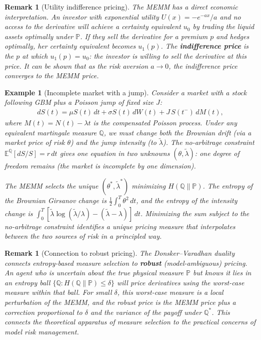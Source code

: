 \documentclass{report}
\theoremstyle{spacedplain}
\theoremstyle{spaceddefinition}
\newtheorem{example}[theorem]{Example}
\theoremstyle{spacedremark}
\newtheorem{remark}[theorem]{Remark}
\begin{document}
\begin{remark}[Utility indifference pricing]
The MEMM has a direct economic interpretation. An investor with exponential utility $U(x) = -e^{-ax}/a$ and no access to the derivative will achieve a certainty equivalent $u_0$ by trading the liquid assets optimally under $\mathbb{P}$. If they sell the derivative for a premium $p$ and hedges
optimally, her certainty equivalent becomes $u_1(p)$. The
\textbf{indifference price} is the $p$ at which $u_1(p) = u_0$: the investor is willing to sell the derivative at this price. It can be shown that as the risk aversion $a \to 0$, the indifference price converges to the MEMM price.
\end{remark}
 
\begin{example}[Incomplete market with a jump]
Consider a market with a stock following GBM plus a Poisson jump of fixed size $J$:
\begin{align}
    dS(t) = \mu S(t)\,dt + \sigma S(t)\,dW(t) + J\,S(t^-)\,dM(t),
\end{align}
where $M(t) = N(t) - \lambda t$ is the compensated Poisson process. Under any equivalent martingale measure $\mathbb{Q}$, we must change both the Brownian drift (via a market price of risk $\theta$) and the jump intensity (to
$\tilde{\lambda}$). The no-arbitrage constraint $\mathbb{E}^\mathbb{Q}[dS/S] = r\,dt$ gives one equation in two unknowns $(\theta, \tilde{\lambda})$: one degree of freedom remains (the market is incomplete by one dimension).
 
The MEMM selects the unique $(\theta^*, \tilde{\lambda}^*)$ minimizing $H(\mathbb{Q}\|\mathbb{P})$. The entropy of the Brownian Girsanov change is $\frac{1}{2}\int_0^T\theta^2\,dt$, and the entropy of the intensity change is $\int_0^T[\tilde{\lambda}\log(\tilde{\lambda}/\lambda) - (\tilde{\lambda} - \lambda)]\,dt$. Minimizing the sum subject to the no-arbitrage constraint identifies a unique pricing measure that interpolates between the two sources of risk in a principled way.
\end{example}
 
\begin{remark}[Connection to robust pricing]
The Donsker--Varadhan duality connects entropy-based measure selection to \textbf{robust} (model-ambiguous) pricing. An agent who is uncertain about the true physical measure $\mathbb{P}$ but knows it lies in an entropy ball
$\{\mathbb{Q}: H(\mathbb{Q}\|\mathbb{P}) \leq \delta\}$ will price derivatives using the worst-case measure within that ball. For small $\delta$, this worst-case measure is a local perturbation of the MEMM, and the robust price is the MEMM
price plus a correction proportional to $\delta$ and the variance of the payoff under $\mathbb{Q}^*$. This connects the theoretical apparatus of measure selection to the practical concerns of model risk management.
\end{remark}
 
\end{document}
